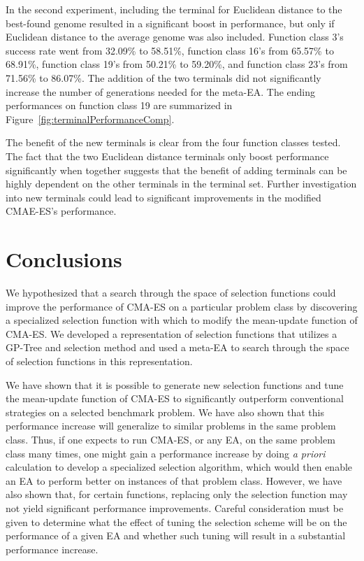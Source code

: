 \documentclass[sigconf]{acmart}
\begin{document}
In the second experiment, including the terminal for Euclidean distance to the best-found genome resulted in a significant boost in performance, but only if Euclidean distance to the average genome was also included. Function class 3's success rate went from 32.09\% to 58.51\%, function class 16's from 65.57\% to 68.91\%, function class 19's from 50.21\% to 59.20\%, and function class 23's from 71.56\% to 86.07\%. The addition of the two terminals did not significantly increase the number of generations needed for the meta-EA. The ending performances on function class 19 are summarized in Figure~\ref{fig:terminalPerformanceComp}.

The benefit of the new terminals is clear from the four function classes tested. The fact that the two Euclidean distance terminals only boost performance significantly when together suggests that the benefit of adding terminals can be highly dependent on the other terminals in the terminal set. Further investigation into new terminals could lead to significant improvements in the modified CMAE-ES's performance.

\section{Conclusions}
\label{Conclusion}
We hypothesized that a search through the space of selection functions could improve the performance of CMA-ES on a particular problem class by discovering a specialized selection function with which to modify the mean-update function of CMA-ES. We developed a representation of selection functions that utilizes a GP-Tree and selection method and used a meta-EA to search through the space of selection functions in this representation. 

We have shown that it is possible to generate new selection functions and tune the mean-update function of CMA-ES to significantly outperform conventional strategies on a selected benchmark problem. We have also shown that this performance increase will generalize to similar problems in the same problem class. Thus, if one expects to run CMA-ES, or any EA, on the same problem class many times, one might gain a performance increase by doing \textit{a priori} calculation to develop a specialized selection algorithm, which would then enable an EA to perform better on instances of that problem class. However, we have also shown that, for certain functions, replacing only the selection function may not yield significant performance improvements. Careful consideration must be given to determine what the effect of tuning the selection scheme will be on the performance of a given EA and whether such tuning will result in a substantial performance increase. 



\end{document}
